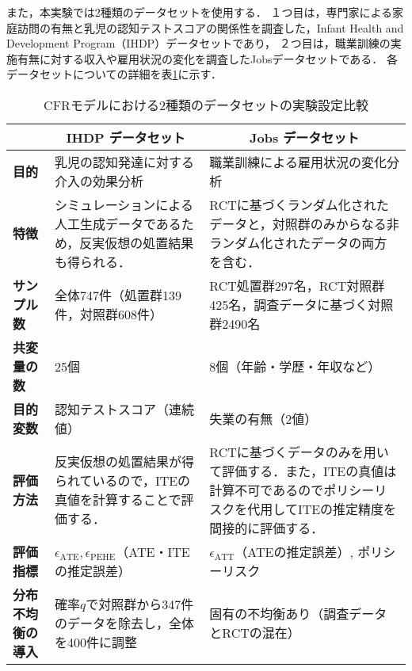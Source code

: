 \documentclass[dvipdfmx]{jreport}
\begin{document}
また，本実験では2種類のデータセットを使用する．
１つ目は，専門家による家庭訪問の有無と乳児の認知テストスコアの関係性を調査した，Infant Health and Development Program（IHDP）データセットであり，
２つ目は，職業訓練の実施有無に対する収入や雇用状況の変化を調査したJobsデータセットである．
各データセットについての詳細を表\ref{tab:cfr_datasets}に示す．
\begin{table}[h]
    \centering
    \caption{CFRモデルにおける2種類のデータセットの実験設定比較}\label{tab:cfr_datasets}
    \begin{tabular}{|p{25mm}||p{60mm}|p{60mm}|} \hline
        \rowcolor{gray!20}
        & \multicolumn{1}{c|}{\textbf{IHDP データセット}} & \multicolumn{1}{c|}{\textbf{Jobs データセット}} \\ \hline \hline

        \textbf{目的} & 乳児の認知発達に対する介入の効果分析 & 職業訓練による雇用状況の変化分析 \\ \hline

        \textbf{特徴} & シミュレーションによる人工生成データであるため，反実仮想の処置結果も得られる． & RCTに基づくランダム化されたデータと，対照群のみからなる非ランダム化されたデータの両方を含む． \\ \hline

        \textbf{サンプル数} & 全体747件（処置群139件，対照群608件） & RCT処置群297名，RCT対照群425名，調査データに基づく対照群2490名 \\ \hline

        \textbf{共変量の数} & 25個 & 8個（年齢・学歴・年収など） \\ \hline

        \textbf{目的変数} & 認知テストスコア（連続値） & 失業の有無（2値） \\ \hline

        \textbf{評価方法} & 反実仮想の処置結果が得られているので，ITEの真値を計算することで評価する． & RCTに基づくデータのみを用いて評価する．また，ITEの真値は計算不可であるのでポリシーリスクを代用してITEの推定精度を間接的に評価する．\\ \hline

        \textbf{評価指標} &  $\epsilon_{\mathrm{ATE}},  \epsilon_{\mathrm{PEHE}}$（ATE・ITEの推定誤差）& $\epsilon_{\mathrm{ATT}}$（ATEの推定誤差）, ポリシーリスク\\ \hline


        \textbf{分布不均衡の導入} & 確率$q$で対照群から347件のデータを除去し，全体を400件に調整 & 固有の不均衡あり（調査データとRCTの混在） \\ \hline

    \end{tabular}
\end{table}
\end{document}
